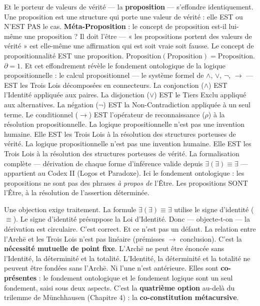 \documentclass[10pt, openany, oneside]{book}
\begin{document}
Et le porteur de valeurs de vérité --- la \textbf{proposition} --- s'effondre identiquement. Une proposition est une structure qui porte une valeur de vérité : elle EST ou N'EST PAS le cas. \textbf{Méta-Proposition} : le concept de proposition est-il lui-même une proposition ? Il doit l'être --- « les propositions portent des valeurs de vérité » est elle-même une affirmation qui est soit vraie soit fausse. Le concept de propositionnalité EST une proposition. $\text{Proposition}(\text{Proposition}) = \text{Proposition}$. $\partial = 1$. Et cet effondrement révèle le fondement ontologique de la logique propositionnelle : le calcul propositionnel --- le système formel de $\wedge$, $\vee$, $\neg$, $\to$ --- EST les Trois Lois décomposées en connecteurs. La conjonction ($\wedge$) EST l'Identité appliquée aux paires. La disjonction ($\vee$) EST le Tiers Exclu appliqué aux alternatives. La négation ($\neg$) EST la Non-Contradiction appliquée à un seul terme. Le conditionnel ($\to$) EST l'opérateur de reconnaissance ($\rho$) à la résolution propositionnelle. La logique propositionnelle n'est pas une invention humaine. Elle EST les Trois Lois à la résolution des structures porteuses de vérité. La logique propositionnelle n'est pas une invention humaine. Elle EST les Trois Lois à la résolution des structures porteuses de vérité. La formalisation complète --- dérivation de chaque forme d'inférence valide depuis $\exists(\exists) \equiv \exists$ --- appartient au Codex II (Logos et Paradoxe). Ici le fondement ontologique : les propositions ne sont pas des phrases \textit{à propos de} l'Être. Les propositions SONT l'Être, à la résolution de l'assertion déterminée.

Une objection exige traitement. La formule $\exists(\exists) \equiv \exists$ utilise le signe d'identité ($\equiv$). Le signe d'identité présuppose la Loi d'Identité. Donc --- objecte-t-on --- la dérivation est circulaire. C'est correct. Et ce n'est pas un défaut. La relation entre l'Arch\={e} et les Trois Lois n'est pas linéaire (prémisses $\to$ conclusion). C'est la \textbf{nécessité mutuelle de point fixe}. L'Arch\={e} ne peut être énoncée sans l'Identité, la déterminité et la totalité. L'Identité, la déterminité et la totalité ne peuvent être fondées sans l'Arch\={e}. Ni l'une n'est antérieure. Elles sont \textbf{co-présentes} : le fondement ontologique et le fondement logique sont un seul fondement, saisi sous deux aspects. C'est la \textbf{quatrième option} au-delà du trilemme de Münchhausen (Chapitre 4) : la \textbf{co-constitution métacursive}.
\end{document}
